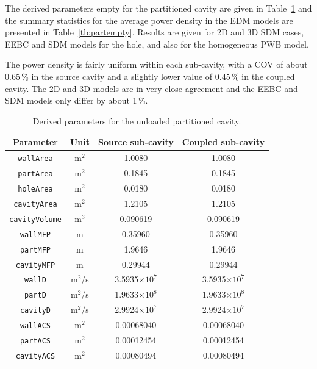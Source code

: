 \documentclass[a4paper]{article}
\numberwithin{equation}{section}
\newcounter{Table}
\begin{document}
The derived parameters empty for the partitioned cavity are given in Table~\ref{tb:derivparamdu} and the summary 
statistics for the average power density in the EDM models are presented in Table~\ref{tb:partempty}. 
Results are given for 2D and 3D SDM cases, EEBC and SDM models for the hole, and also for the homogeneous 
PWB model. 

The power density is fairly uniform within each sub-cavity, with a COV of about 0.65\,\% in the source cavity
and a slightly lower value of 0.45\,\% in the coupled cavity. The 2D and 3D models are in very close agreement
and the EEBC and SDM models only differ by about 1\,\%.

\begin{table}[h]
\begin{center}
\begin{tabular}{|c|c|c|c|}
\hline
\textbf{Parameter}     &\textbf{Unit} &\textbf{Source sub-cavity} &\textbf{Coupled sub-cavity}\\ 
\hline
\texttt{wallArea}      &m$^2$         &1.0080                     &1.0080              \\
\texttt{partArea}      &m$^2$         &0.1845                     &0.1845              \\
\texttt{holeArea}      &m$^2$         &0.0180                     &0.0180              \\
\texttt{cavityArea}    &m$^2$         &1.2105                     &1.2105              \\
\texttt{cavityVolume}  &m$^3$         &0.090619                   &0.090619            \\
\texttt{wallMFP}       &m             &0.35960                    &0.35960             \\
\texttt{partMFP}       &m             &1.9646                     &1.9646              \\
\texttt{cavityMFP}     &m             &0.29944                    &0.29944             \\
\texttt{wallD}         &m$^2$/s       &3.5935$\times 10^7$        &3.5935$\times 10^7$ \\
\texttt{partD}         &m$^2$/s       &1.9633$\times 10^8$        &1.9633$\times 10^8$ \\
\texttt{cavityD}       &m$^2$/s       &2.9924$\times 10^7$        &2.9924$\times 10^7$ \\
\texttt{wallACS}       &m$^2$         &0.00068040                 &0.00068040          \\
\texttt{partACS}       &m$^2$         &0.00012454                 &0.00012454          \\
\texttt{cavityACS}     &m$^2$         &0.00080494                 &0.00080494          \\
\hline
\end{tabular}
\end{center}
\caption{\label{tb:derivparamdu} Derived parameters for the unloaded partitioned cavity.}
\end{table}
\end{document}
